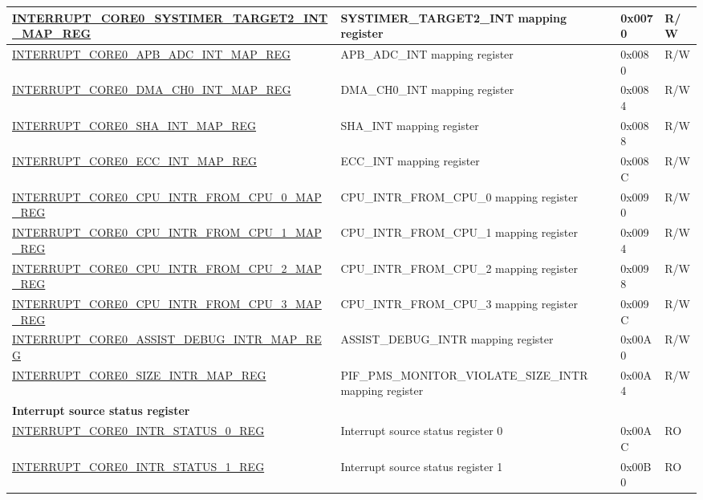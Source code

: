 \begin{longtable}{ | p{10cm} | m{10cm} | m{1.3cm} | m{1.0cm} | }
\hyperref[regdesc:INTERRUPTCORE0SYSTIMERTARGET2INTMAPREG]{INTERRUPT\_CORE0\_SYSTIMER\_TARGET2\_INT\_MAP\_REG} & SYSTIMER\_TARGET2\_INT mapping register & 0x0070 & R/W \\ \hline
\hyperref[regdesc:INTERRUPTCORE0APBADCINTMAPREG]{INTERRUPT\_CORE0\_APB\_ADC\_INT\_MAP\_REG} & APB\_ADC\_INT mapping register & 0x0080 & R/W \\ \hline
\hyperref[regdesc:INTERRUPTCORE0DMACH0INTMAPREG]{INTERRUPT\_CORE0\_DMA\_CH0\_INT\_MAP\_REG} & DMA\_CH0\_INT mapping register & 0x0084 & R/W \\ \hline
\hyperref[regdesc:INTERRUPTCORE0SHAINTMAPREG]{INTERRUPT\_CORE0\_SHA\_INT\_MAP\_REG} & SHA\_INT mapping register & 0x0088 & R/W \\ \hline
\hyperref[regdesc:INTERRUPTCORE0ECCINTMAPREG]{INTERRUPT\_CORE0\_ECC\_INT\_MAP\_REG} & ECC\_INT mapping register & 0x008C & R/W \\ \hline
\hyperref[regdesc:INTERRUPTCORE0CPUINTRFROMCPU0MAPREG]{INTERRUPT\_CORE0\_CPU\_INTR\_FROM\_CPU\_0\_MAP\_REG} & CPU\_INTR\_FROM\_CPU\_0 mapping register & 0x0090 & R/W \\ \hline
\hyperref[regdesc:INTERRUPTCORE0CPUINTRFROMCPU1MAPREG]{INTERRUPT\_CORE0\_CPU\_INTR\_FROM\_CPU\_1\_MAP\_REG} & CPU\_INTR\_FROM\_CPU\_1 mapping register & 0x0094 & R/W \\ \hline
\hyperref[regdesc:INTERRUPTCORE0CPUINTRFROMCPU2MAPREG]{INTERRUPT\_CORE0\_CPU\_INTR\_FROM\_CPU\_2\_MAP\_REG} & CPU\_INTR\_FROM\_CPU\_2 mapping register & 0x0098 & R/W \\ \hline
\hyperref[regdesc:INTERRUPTCORE0CPUINTRFROMCPU3MAPREG]{INTERRUPT\_CORE0\_CPU\_INTR\_FROM\_CPU\_3\_MAP\_REG} & CPU\_INTR\_FROM\_CPU\_3 mapping register & 0x009C & R/W \\ \hline
\hyperref[regdesc:INTERRUPTCORE0ASSISTDEBUGINTRMAPREG]{INTERRUPT\_CORE0\_ASSIST\_DEBUG\_INTR\_MAP\_REG} & ASSIST\_DEBUG\_INTR mapping register & 0x00A0 & R/W \\ \hline
\hyperref[regdesc:INTERRUPTCORE0PIFPMSMONITORVIOLATESIZEINTRMAPREG]{INTERRUPT\_CORE0\_SIZE\_INTR\_MAP\_REG} & PIF\_PMS\_MONITOR\_VIOLATE\_SIZE\_INTR mapping register & 0x00A4 & R/W \\ \hline
\multicolumn{4}{|l|}{\textbf{Interrupt source status register}} \\ \hline
\hyperref[regdesc:INTERRUPTCORE0INTRSTATUS0REG]{INTERRUPT\_CORE0\_INTR\_STATUS\_0\_REG} & Interrupt source status register 0 & 0x00AC & RO \\ \hline
\hyperref[regdesc:INTERRUPTCORE0INTRSTATUS1REG]{INTERRUPT\_CORE0\_INTR\_STATUS\_1\_REG} & Interrupt source status register 1 & 0x00B0 & RO \\ \hline

\end{longtable}
